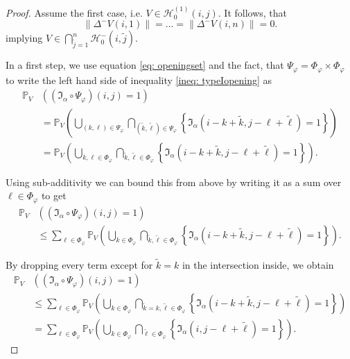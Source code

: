 \documentclass[a4paper,12pt]{article}
\newcommand{\norm}[1]{\lVert#1\rVert}
\theoremstyle{plain}
\theoremstyle{definition}
\begin{document}
\begin{proof}
	Assume the first case, i.e. $V \in \mathcal{H}_0^{(1)}(i, j)$. It follows, that
	\begin{equation*}
		\norm{\Delta^- V(i, 1)} = \ldots = \norm{\Delta^- V(i, n)} = 0.
	\end{equation*}
	implying $V \in \bigcap_{\tilde{j} = 1}^n \mathcal{H}_0^-(i, \tilde{j})$.
	
	In a first step, we use equation \eqref{eq: openingset} and the fact, that $\Psi_\varphi = \Phi_\varphi \times \Phi_\varphi$ to write the left hand side of inequality \eqref{ineq: typeIopening} as
	\begin{align*}
		\mathbb{P}_V&\left( (\mathfrak{I}_\alpha \circ \Psi_\varphi)(i, j) = 1 \right) \\
		&= \mathbb{P}_V\left( \bigcup_{(k, \ell) \in \Psi_\varphi} \bigcap_{(\tilde{k}, \tilde{\ell}) \in \Psi_\varphi} \left\{ \mathfrak{I}_\alpha(i - k + \tilde{k}, j - \ell + \tilde{\ell}) = 1 \right\} \right) \\
		&= \mathbb{P}_V\left( \bigcup_{k, \ell \in \Phi_\varphi} \bigcap_{\tilde{k}, \tilde{\ell} \in \Phi_\varphi} \left\{ \mathfrak{I}_\alpha(i - k + \tilde{k}, j - \ell + \tilde{\ell}) = 1 \right\} \right).
	\end{align*}
	
	Using sub-additivity we can bound this from above by writing it as a sum over $\ell \in \Phi_\varphi$ to get
	\begin{align*}
		\mathbb{P}_V&\left( (\mathfrak{I}_\alpha \circ \Psi_\varphi)(i, j) = 1 \right) \\
		&\leq \sum_{\ell \in \Phi_\varphi} \mathbb{P}_V\left( \bigcup_{k \in \Phi_\varphi} \bigcap_{\tilde{k}, \tilde{\ell} \in \Phi_\varphi} \left\{ \mathfrak{I}_\alpha(i - k + \tilde{k}, j - \ell + \tilde{\ell}) = 1 \right\} \right).
	\end{align*}
	
	By dropping every term except for $\tilde{k} = k$ in the intersection inside, we obtain
	\begin{align*}
		\mathbb{P}_V&\left( (\mathfrak{I}_\alpha \circ \Psi_\varphi)(i, j) = 1 \right) \\
		&\leq \sum_{\ell \in \Phi_\varphi} \mathbb{P}_V\left( \bigcup_{k \in \Phi_\varphi} \bigcap_{\tilde{k} = k, \tilde{\ell} \in \Phi_\varphi} \left\{ \mathfrak{I}_\alpha(i - k + \tilde{k}, j - \ell + \tilde{\ell}) = 1 \right\} \right) \\
		&= \sum_{\ell \in \Phi_\varphi} \mathbb{P}_V\left( \bigcup_{k \in \Phi_\varphi} \bigcap_{\tilde{\ell} \in \Phi_\varphi} \left\{ \mathfrak{I}_\alpha(i, j - \ell + \tilde{\ell}) = 1 \right\} \right).
	\end{align*}
	

\end{proof}
\end{document}
